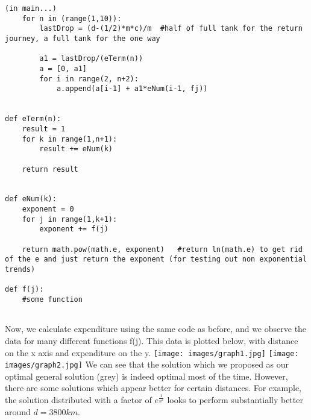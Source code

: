 \documentclass{homework}
\begin{document}
\begin{lstlisting}
(in main...)
    for n in (range(1,10)):
        lastDrop = (d-(1/2)*m*c)/m  #half of full tank for the return journey, a full tank for the one way

        a1 = lastDrop/(eTerm(n))
        a = [0, a1]
        for i in range(2, n+2):
            a.append(a[i-1] + a1*eNum(i-1, fj))


def eTerm(n):
    result = 1
    for k in range(1,n+1):
        result += eNum(k)

    return result


def eNum(k):
    exponent = 0
    for j in range(1,k+1):
        exponent += f(j)
    
    return math.pow(math.e, exponent)   #return ln(math.e) to get rid of the e and just return the exponent (for testing out non exponential trends)

def f(j):
    #some function
    
\end{lstlisting}
Now, we calculate expenditure using the same code as before, and we observe the data for many different functions f(j). This data is plotted below, with distance on the x axis and expenditure on the y.
\newline\newline
\texttt{[image: images/graph1.jpg]}
\texttt{[image: images/graph2.jpg]}
\newline\newline
We can see that the solution which we proposed as our optimal general solution (grey) is indeed optimal most of the time. However, there are some solutions which appear better for certain distances. For example, the solution distributed with a factor of $e^{\frac{1}{n^2}}$ looks to perform substantially better around $d = 3800km$.
\end{document}
